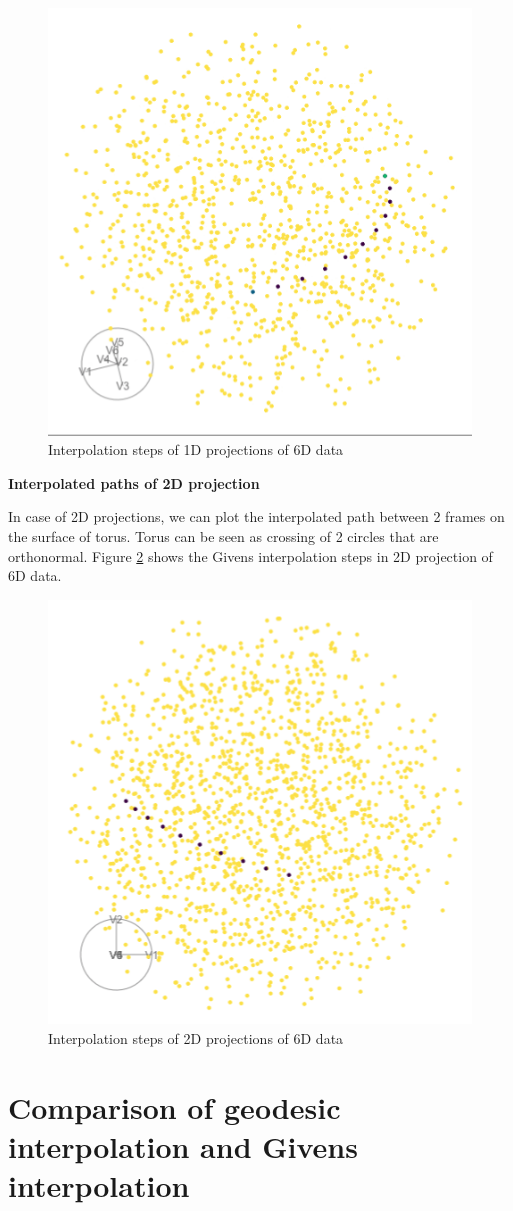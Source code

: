 \begin{figure}

{\centering \includegraphics[width=0.5\linewidth]{sphere_static} 

}

\caption{Interpolation steps of 1D projections of 6D data}\label{fig:1d-path-static}
\end{figure}

\textbf{Interpolated paths of 2D projection}

In case of 2D projections, we can plot the interpolated path between 2 frames on the surface of torus. Torus can be seen as crossing of 2 circles that are orthonormal. Figure \ref{fig:2d-path-static} shows the Givens interpolation steps in 2D projection of 6D data.

\begin{figure}

{\centering \includegraphics[width=0.5\linewidth]{torus_static} 

}

\caption{Interpolation steps of 2D projections of 6D data}\label{fig:2d-path-static}
\end{figure}

\hypertarget{comparison-of-geodesic-interpolation-and-givens-interpolation}{%
\section{Comparison of geodesic interpolation and Givens interpolation}\label{comparison-of-geodesic-interpolation-and-givens-interpolation}}

